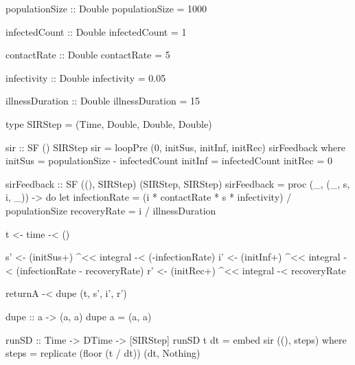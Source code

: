 \begin{HaskellCode}
populationSize :: Double
populationSize = 1000

infectedCount :: Double
infectedCount = 1

contactRate :: Double
contactRate = 5

infectivity :: Double
infectivity = 0.05

illnessDuration :: Double
illnessDuration = 15

type SIRStep = (Time, Double, Double, Double)

sir :: SF () SIRStep
sir = loopPre (0, initSus, initInf, initRec) sirFeedback
  where
    initSus = populationSize - infectedCount
    initInf = infectedCount
    initRec = 0

    sirFeedback :: SF ((), SIRStep) (SIRStep, SIRStep)
    sirFeedback = proc (_, (_, s, i, _)) -> do
      let infectionRate = (i * contactRate * s * infectivity) / populationSize
          recoveryRate  = i / illnessDuration

      t <- time -< ()

      s' <- (initSus+) ^<< integral -< (-infectionRate)
      i' <- (initInf+) ^<< integral -< (infectionRate - recoveryRate)
      r' <- (initRec+) ^<< integral -< recoveryRate

      returnA -< dupe (t, s', i', r')

    dupe :: a -> (a, a)
    dupe a = (a, a)

runSD :: Time -> DTime -> [SIRStep]
runSD t dt = embed sir ((), steps)
  where
    steps = replicate (floor (t / dt)) (dt, Nothing)
\end{HaskellCode}
